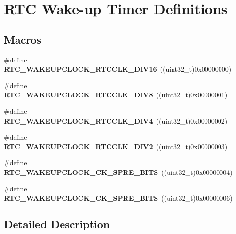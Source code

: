 \hypertarget{group___r_t_c_ex___wakeup___timer___definitions}{}\section{R\+TC Wake-\/up Timer Definitions}
\label{group___r_t_c_ex___wakeup___timer___definitions}
\subsection*{Macros}
\begin{DoxyCompactItemize}
\item 
\#define {\bfseries R\+T\+C\+\_\+\+W\+A\+K\+E\+U\+P\+C\+L\+O\+C\+K\+\_\+\+R\+T\+C\+C\+L\+K\+\_\+\+D\+I\+V16}~((uint32\+\_\+t)0x00000000)\hypertarget{group___r_t_c_ex___wakeup___timer___definitions_ga3864a5d628a34118dfcc86e9b8958e51}{}\label{group___r_t_c_ex___wakeup___timer___definitions_ga3864a5d628a34118dfcc86e9b8958e51}

\item 
\#define {\bfseries R\+T\+C\+\_\+\+W\+A\+K\+E\+U\+P\+C\+L\+O\+C\+K\+\_\+\+R\+T\+C\+C\+L\+K\+\_\+\+D\+I\+V8}~((uint32\+\_\+t)0x00000001)\hypertarget{group___r_t_c_ex___wakeup___timer___definitions_gaaa4ec1d6b96e88b070899d0dd5d8869f}{}\label{group___r_t_c_ex___wakeup___timer___definitions_gaaa4ec1d6b96e88b070899d0dd5d8869f}

\item 
\#define {\bfseries R\+T\+C\+\_\+\+W\+A\+K\+E\+U\+P\+C\+L\+O\+C\+K\+\_\+\+R\+T\+C\+C\+L\+K\+\_\+\+D\+I\+V4}~((uint32\+\_\+t)0x00000002)\hypertarget{group___r_t_c_ex___wakeup___timer___definitions_gade098ac6e923b02c06de003f61aafd2c}{}\label{group___r_t_c_ex___wakeup___timer___definitions_gade098ac6e923b02c06de003f61aafd2c}

\item 
\#define {\bfseries R\+T\+C\+\_\+\+W\+A\+K\+E\+U\+P\+C\+L\+O\+C\+K\+\_\+\+R\+T\+C\+C\+L\+K\+\_\+\+D\+I\+V2}~((uint32\+\_\+t)0x00000003)\hypertarget{group___r_t_c_ex___wakeup___timer___definitions_gab1013526c00cfab26015267f17b6553f}{}\label{group___r_t_c_ex___wakeup___timer___definitions_gab1013526c00cfab26015267f17b6553f}

\item 
\#define {\bfseries R\+T\+C\+\_\+\+W\+A\+K\+E\+U\+P\+C\+L\+O\+C\+K\+\_\+\+C\+K\+\_\+\+S\+P\+R\+E\+\_\+B\+I\+TS}~((uint32\+\_\+t)0x00000004)\hypertarget{group___r_t_c_ex___wakeup___timer___definitions_ga2d75cf962faf3257ada7f102fccfcb62}{}\label{group___r_t_c_ex___wakeup___timer___definitions_ga2d75cf962faf3257ada7f102fccfcb62}

\item 
\#define {\bfseries R\+T\+C\+\_\+\+W\+A\+K\+E\+U\+P\+C\+L\+O\+C\+K\+\_\+\+C\+K\+\_\+\+S\+P\+R\+E\+\_\+B\+I\+TS}~((uint32\+\_\+t)0x00000006)\hypertarget{group___r_t_c_ex___wakeup___timer___definitions_gab4ff75ad48550530f95698f269a617dd}{}\label{group___r_t_c_ex___wakeup___timer___definitions_gab4ff75ad48550530f95698f269a617dd}

\end{DoxyCompactItemize}


\subsection{Detailed Description}

